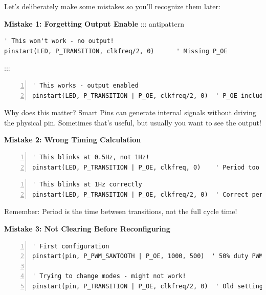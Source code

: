 \documentclass[11pt,a4paper,oneside,english]{book}
\begin{document}
Let's deliberately make some mistakes so you'll recognize them later:

\textbf{Mistake 1: Forgetting Output Enable} ::: antipattern

\begin{lstlisting}
' This won't work - no output!
pinstart(LED, P_TRANSITION, clkfreq/2, 0)      ' Missing P_OE
\end{lstlisting}

:::

\begin{Spin2Block}
\begin{Verbatim}[numbers=left,numbersep=5pt,xleftmargin=15pt]
' This works - output enabled
pinstart(LED, P_TRANSITION | P_OE, clkfreq/2, 0)  ' P_OE included
\end{Verbatim}
\end{Spin2Block}

Why does this matter? Smart Pins can generate internal signals without
driving the physical pin. Sometimes that's useful, but usually you want
to see the output!

\textbf{Mistake 2: Wrong Timing Calculation}

\begin{AntipatternBlock}
\begin{Verbatim}[numbers=left,numbersep=5pt,xleftmargin=15pt]
' This blinks at 0.5Hz, not 1Hz!
pinstart(LED, P_TRANSITION | P_OE, clkfreq, 0)    ' Period too long
\end{Verbatim}
\end{AntipatternBlock}

\begin{Spin2Block}
\begin{Verbatim}[numbers=left,numbersep=5pt,xleftmargin=15pt]
' This blinks at 1Hz correctly
pinstart(LED, P_TRANSITION | P_OE, clkfreq/2, 0)  ' Correct period
\end{Verbatim}
\end{Spin2Block}

Remember: Period is the time between transitions, not the full cycle
time!

\textbf{Mistake 3: Not Clearing Before Reconfiguring}

\begin{AntipatternBlock}
\begin{Verbatim}[numbers=left,numbersep=5pt,xleftmargin=15pt]
' First configuration
pinstart(pin, P_PWM_SAWTOOTH | P_OE, 1000, 500)  ' 50% duty PWM

' Trying to change modes - might not work!
pinstart(pin, P_TRANSITION | P_OE, clkfreq/2, 0)  ' Old settings interfere
\end{Verbatim}
\end{AntipatternBlock}
\end{document}
